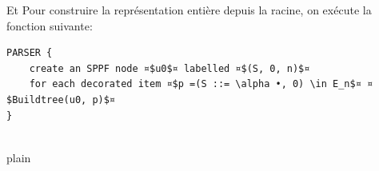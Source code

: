 \documentclass[10pt]{report}
\begin{document}
Et Pour construire la représentation entière depuis la racine, on exécute la fonction suivante: 

\begin{lstlisting}[frame=single]		
PARSER { 
	create an SPPF node ¤$u0$¤ labelled ¤$(S, 0, n)$¤
	for each decorated item ¤$p =(S ::= \alpha •, 0) \in E_n$¤ ¤$Buildtree(u0, p)$¤ 
}


\end{lstlisting}			
		
 {plain}
  
\end{document}

